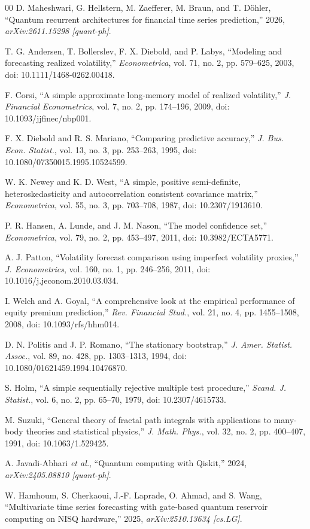 \documentclass{ieeeaccess}
\begin{document}
\begin{thebibliography}{00}
D. Maheshwari, G. Hellstern, M. Zaefferer, M. Braun, and T. D\"ohler, ``Quantum recurrent architectures for financial time series prediction,'' 2026, \emph{arXiv:2611.15298 [quant-ph]}.

T. G. Andersen, T. Bollerslev, F. X. Diebold, and P. Labys, ``Modeling and forecasting realized volatility,'' \emph{Econometrica}, vol. 71, no. 2, pp. 579--625, 2003, doi: 10.1111/1468-0262.00418.

F. Corsi, ``A simple approximate long-memory model of realized volatility,'' \emph{J. Financial Econometrics}, vol. 7, no. 2, pp. 174--196, 2009, doi: 10.1093/jjfinec/nbp001.

F. X. Diebold and R. S. Mariano, ``Comparing predictive accuracy,'' \emph{J. Bus. Econ. Statist.}, vol. 13, no. 3, pp. 253--263, 1995, doi: 10.1080/07350015.1995.10524599.

W. K. Newey and K. D. West, ``A simple, positive semi-definite, heteroskedasticity and autocorrelation consistent covariance matrix,'' \emph{Econometrica}, vol. 55, no. 3, pp. 703--708, 1987, doi: 10.2307/1913610.

P. R. Hansen, A. Lunde, and J. M. Nason, ``The model confidence set,'' \emph{Econometrica}, vol. 79, no. 2, pp. 453--497, 2011, doi: 10.3982/ECTA5771.

A. J. Patton, ``Volatility forecast comparison using imperfect volatility proxies,'' \emph{J. Econometrics}, vol. 160, no. 1, pp. 246--256, 2011, doi: 10.1016/j.jeconom.2010.03.034.

I. Welch and A. Goyal, ``A comprehensive look at the empirical performance of equity premium prediction,'' \emph{Rev. Financial Stud.}, vol. 21, no. 4, pp. 1455--1508, 2008, doi: 10.1093/rfs/hhm014.

D. N. Politis and J. P. Romano, ``The stationary bootstrap,'' \emph{J. Amer. Statist. Assoc.}, vol. 89, no. 428, pp. 1303--1313, 1994, doi: 10.1080/01621459.1994.10476870.

S. Holm, ``A simple sequentially rejective multiple test procedure,'' \emph{Scand. J. Statist.}, vol. 6, no. 2, pp. 65--70, 1979, doi: 10.2307/4615733.

M. Suzuki, ``General theory of fractal path integrals with applications to many-body theories and statistical physics,'' \emph{J. Math. Phys.}, vol. 32, no. 2, pp. 400--407, 1991, doi: 10.1063/1.529425.

A. Javadi-Abhari \emph{et al.}, ``Quantum computing with Qiskit,'' 2024, \emph{arXiv:2405.08810 [quant-ph]}.

W. Hamhoum, S. Cherkaoui, J.-F. Laprade, O. Ahmad, and S. Wang, ``Multivariate time series forecasting with gate-based quantum reservoir computing on NISQ hardware,'' 2025, \emph{arXiv:2510.13634 [cs.LG]}.

\end{thebibliography}
\end{document}
